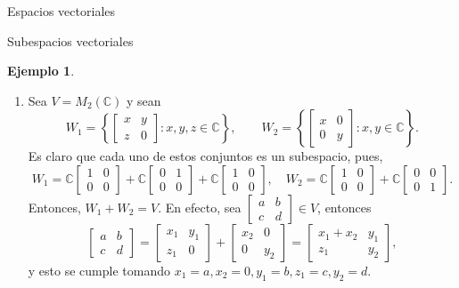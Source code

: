 \documentclass[a4paper,12pt,twoside,spanish,reqno]{amsbook}
\theoremstyle{definition}
\newtheorem{ejemplo}{Ejemplo}[section]
\theoremstyle{remark}
\newcommand{\C}{\mathbb C}
\begin{document}
\begin{chapter}{Espacios vectoriales}
\begin{section}{Subespacios vectoriales}
\begin{ejemplo}
\begin{enumerate}
			\item Sea $V = M_2(\C)$ y sean 
			\begin{equation*}
				W_1 = \left\{\begin{bmatrix} x&y\\z&0 \end{bmatrix}: x,y,z \in \C \right\}, 
				\qquad W_2 = \left\{\begin{bmatrix} x&0\\0&y \end{bmatrix}: x,y \in \C \right\}.
			\end{equation*} 
			Es claro que cada uno de estos conjuntos es un subespacio, pues,
			$$
			W_1 = \C \begin{bmatrix} 1&0\\0&0 \end{bmatrix} +
			\C \begin{bmatrix} 0&1\\0&0 \end{bmatrix} +
			\C \begin{bmatrix} 1&0\\0&0 \end{bmatrix}, \quad 
			W_2 = \C \begin{bmatrix} 1&0\\0&0 \end{bmatrix} +
			\C \begin{bmatrix} 0&0\\0&1 \end{bmatrix}. 
			$$
			Entonces, $W_1 + W_2 = V$. En  efecto, sea 
			$\begin{bmatrix} a&b\\c&d\end{bmatrix} \in V$, entonces
			$$
			\begin{bmatrix} a&b\\c&d\end{bmatrix} =  \begin{bmatrix} x_1&y_1\\z_1&0 \end{bmatrix} + 
			\begin{bmatrix} x_2&0\\0&y_2 \end{bmatrix} =
			\begin{bmatrix} x_1+x_2&y_1\\z_1&y_2 \end{bmatrix},
			$$
			y esto se cumple  tomando $x_1 = a, x_2 =0,  y_1 = b, z_1= c, y_2 =d$.
			

\end{enumerate}
\end{ejemplo}
\end{section}
\end{chapter}
\end{document}
